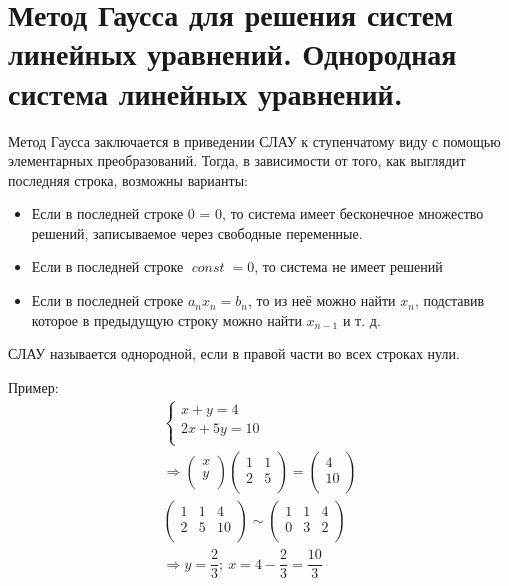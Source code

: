 \documentclass[12pt]{article}
\DeclareMathOperator{\const}{\textit{const}}
\begin{document}
\begin{sloppypar}
    \section{Метод Гаусса для решения систем линейных уравнений. Однородная система линейных уравнений.}
    Метод Гаусса заключается в приведении СЛАУ к ступенчатому виду с помощью элементарных преобразований. Тогда, в зависимости от того, как выглядит последняя строка, возможны варианты:
    \begin{itemize}
        \item Если в последней строке 0 = 0, то система имеет бесконечное множество решений, записываемое через свободные переменные.
        \item Если в последней строке $\const = 0$, то система не имеет решений
        \item Если в последней строке $a_nx_n = b_n$, то из неё можно найти $x_n$, подставив которое в предыдущую строку можно найти $x_{n - 1}$ и т. д.
    \end{itemize}

    СЛАУ называется однородной, если в правой части во всех строках нули.

    Пример:
    \[
        \begin{array}{l}
            \begin{cases}
                x + y = 4    \\
                2x + 5y = 10 \\
            \end{cases}   \\
            \Rightarrow \begin{pmatrix}
                            x \\ y \\
                        \end{pmatrix}
            \begin{pmatrix}
                1 & 1 \\
                2 & 5 \\
            \end{pmatrix}
            =
            \begin{pmatrix}
                4 \\ 10 \\
            \end{pmatrix} \\
            \begin{pmatrix}
                1 & 1 & 4  \\
                2 & 5 & 10 \\
            \end{pmatrix}
            \sim
            \begin{pmatrix}
                1 & 1 & 4 \\
                0 & 3 & 2 \\
            \end{pmatrix} \\
            \Rightarrow y = \dfrac{2}{3};\ x = 4 - \dfrac{2}{3} = \dfrac{10}{3}
        \end{array}
    \]


\end{sloppypar}
\end{document}
